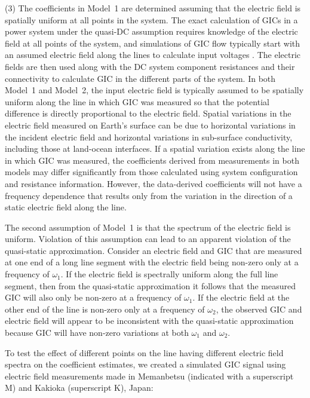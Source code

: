\documentclass[draft,linenumbers]{agujournal2018}
\begin{document}
(3) The coefficients in Model~1 are determined assuming that the electric field is spatially uniform at all points in the system. The exact calculation of GICs in a power system under the quasi-DC assumption requires knowledge of the electric field at all points of the system, and simulations of GIC flow typically start with an assumed electric field along the lines to calculate input voltages \citep{Albertson1981,Lehtinen1985, Pirjola2009}. The electric fields are then used along with the DC system component resistances and their connectivity to calculate GIC in the different parts of the system. In both Model~1 and Model~2, the input electric field is typically assumed to be spatially uniform along the line in which GIC was measured so that the potential difference is directly proportional to the electric field. Spatial variations in the electric field measured on Earth's surface can be due to horizontal variations in the incident electric field and horizontal variations in sub-surface conductivity, including those at land-ocean interfaces. If a spatial variation exists along the line in which GIC was measured, the coefficients derived from measurements in both models may differ significantly from those calculated using system configuration and resistance information. However, the data-derived coefficients will not have a frequency dependence that results only from the variation in the direction of a static electric field along the line.

The second assumption of Model~1 is that the spectrum of the electric field is uniform. Violation of this assumption can lead to an apparent violation of the quasi-static approximation. Consider an electric field and GIC that are measured at one end of a long line segment with the electric field being non-zero only at a frequency of $\omega_1$. If the electric field is spectrally uniform along the full line segment, then from the quasi-static approximation it follows that the measured GIC will also only be non-zero at a frequency of $\omega_1$. If the electric field at the other end of the line is non-zero only at a frequency of $\omega_2$, the observed GIC and electric field will appear to be inconsistent with the quasi-static approximation because GIC will have non-zero variations at both $\omega_1$ and $\omega_2$.

To test the effect of different points on the line having different electric field spectra on the coefficient estimates, we created a simulated GIC signal using electric field measurements made in Memanbetsu (indicated with a superscript M) and Kakioka (superscript K), Japan:
\end{document}
